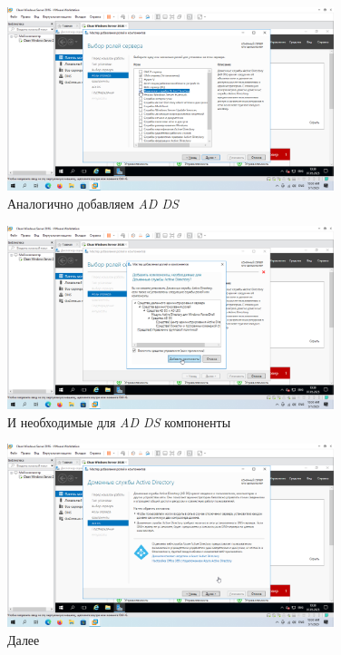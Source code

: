\documentclass[a4paper]{article}
\begin{document}
  \begin{figure}[H]
    \centering
    \includegraphics[width=0.85\textwidth]{9_0047}
    \caption{Аналогично добавляем \textit{AD DS}}
    \label{img:0046}
  \end{figure}

  \begin{figure}[H]
    \centering
    \includegraphics[width=0.85\textwidth]{9_0046}
    \caption{И необходимые для \textit{AD DS} компоненты}
    \label{img:0047}
  \end{figure}

  \begin{figure}[H]
    \centering
    \includegraphics[width=0.85\textwidth]{9_0048}
    \caption{Далее}
    \label{img:0048}
  \end{figure}
\end{document}
